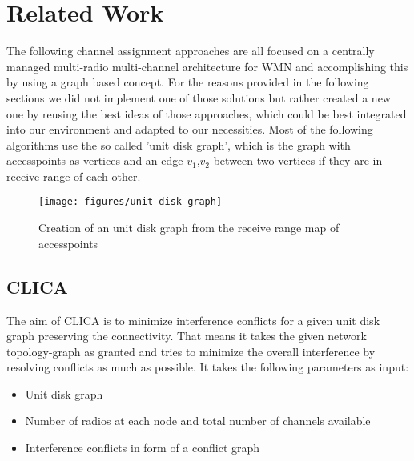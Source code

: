 \chapter{Related Work}
  The following channel assignment approaches are all focused on a centrally managed multi-radio multi-channel architecture for \ac{WMN} and 
  accomplishing this by using a graph based concept.\cite{overview_caa}
  For the reasons provided in the following sections we did not implement one of those solutions but rather created a new one by reusing the best ideas of those approaches, which
  could be best integrated into our environment and adapted to our necessities. Most of the following algorithms use the so called 'unit disk graph', which is the graph
  with accesspoints as vertices and an edge \(v_1\),\(v_2\) between two vertices if they are in receive range of each other.
  \begin{figure}[t]
    \centering
    \texttt{[image: figures/unit-disk-graph]}
    \caption{Creation of an unit disk graph from the receive range map of accesspoints}
    \label{fig:unit-disk-graph}
  \end{figure}
\section{\ac{CLICA}}
  The aim of \ac{CLICA}\cite{CLICA} is to minimize interference conflicts for a given unit disk graph preserving the connectivity.
  That means it takes the given network topology-graph as granted and tries to minimize the overall interference by resolving conflicts as much as possible.
  It takes the following parameters as input:
  \begin{itemize}
   \item Unit disk graph
   \item Number of radios at each node and total number of channels available
   \item Interference conflicts in form of a conflict graph
  \end{itemize}


